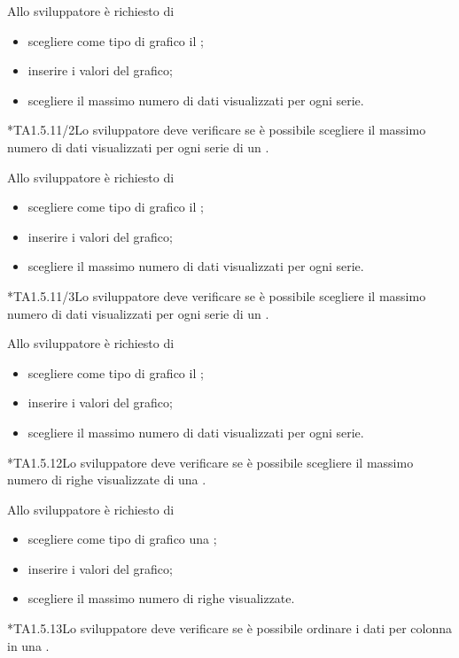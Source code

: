 		Allo sviluppatore è richiesto di
		\begin{itemize}
			\item scegliere come tipo di grafico il ;
			\item inserire i valori del grafico;
			\item scegliere il massimo numero di dati visualizzati per ogni serie.
		\end{itemize}

	*{TA1.5.11/2}Lo sviluppatore deve verificare se è possibile scegliere il massimo numero di dati visualizzati per ogni serie di un .

		Allo sviluppatore è richiesto di
		\begin{itemize}
			\item scegliere come tipo di grafico il ;
			\item inserire i valori del grafico;
			\item scegliere il massimo numero di dati visualizzati per ogni serie.
		\end{itemize}

	*{TA1.5.11/3}Lo sviluppatore deve verificare se è possibile scegliere il massimo numero di dati visualizzati per ogni serie di un .

		Allo sviluppatore è richiesto di
		\begin{itemize}
			\item scegliere come tipo di grafico il ;
			\item inserire i valori del grafico;
			\item scegliere il massimo numero di dati visualizzati per ogni serie.
		\end{itemize}

	*{TA1.5.12}Lo sviluppatore deve verificare se è possibile scegliere il massimo numero di righe visualizzate di una .

		Allo sviluppatore è richiesto di
		\begin{itemize}
			\item scegliere come tipo di grafico una ;
			\item inserire i valori del grafico;
			\item scegliere il massimo numero di righe visualizzate.
		\end{itemize}

	*{TA1.5.13}Lo sviluppatore deve verificare se è possibile ordinare i dati per colonna in una .

